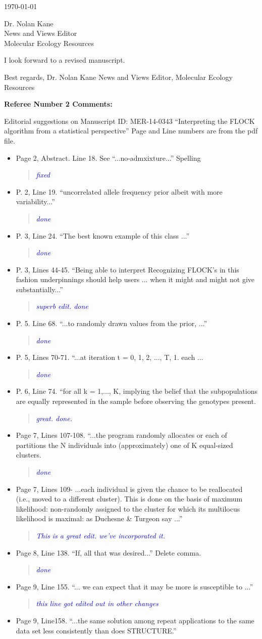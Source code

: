 \documentclass[11pt]{letter}
\newcommand{\reply}[1]{\begin{quotation}\small\sl\textcolor{blue}{#1}\end{quotation}}
\begin{document}
\begin{letter}{ \today 

Dr. Nolan Kane\\
News and Views Editor\\
Molecular Ecology Resources \\
}
I look forward to a revised manuscript.

Best regards,
Dr. Nolan Kane
News and Views Editor, Molecular Ecology Resources



{\bf Referee Number 2 Comments:}

Editorial suggestions on Manuscript ID: MER-14-0343 ``Interpreting the FLOCK algorithm from a statistical perspective''
Page and Line numbers are from the pdf file.
\begin{itemize}

\item Page 2, Abstract. Line 18. See ``...no-admxixture...'' Spelling
\reply{fixed}
\item P. 2, Line 19. ``uncorrelated allele frequency prior albeit with more variability...''
\reply{done}
\item P. 3, Line 24. ``The best known example of this class ...''
\reply{done}
\item P. 3, Lines 44-45. ``Being able to interpret Recognizing FLOCK's in this fashion underpinnings should help users ... when it might and might not give substantially...''
\reply{superb edit. done}
\item P. 5. Line 68. ``...to randomly drawn values from the prior, ...''
\reply{done}
\item P. 5, Lines 70-71. ``...at iteration t = 0, 1, 2, ..., T,
1. each ...
\reply{done}
\item P. 6, Line 74. ``for all k = 1,..., K, implying the belief that the subpopulations are equally
represented in the sample before observing the genotypes present.
\reply{great. done.}
\item Page 7, Lines 107-108. ``...the program randomly allocates or each of partitions the N
individuals into (approximately) one of K equal-sized clusters.
\reply{done}
\item Page 7, Lines 109- ...each individual is given the chance to be reallocated (i.e., moved to a different cluster). This is done on the basis of maximum likelihood: non-randomly assigned to the cluster for which its multilocus likelihood is maximal: as Duchesne \& Turgeon say ...''
\reply{This is a great edit. we've incorporated it.}
\item Page 8, Line 138. ``If, all that was desired...'' Delete comma. 
\reply{done}
\item Page 9, Line 155. ``... we can expect that it may be more is susceptible to ...''
\reply{this line got edited out in other changes}
\item Page 9, Line158. ``...the same solution among repeat applications to the same data set less consistently than does STRUCTURE.''

\end{itemize}
\end{letter}
\end{document}
